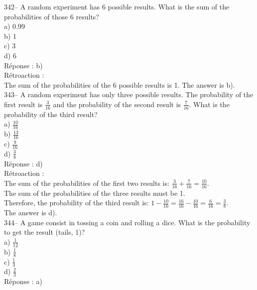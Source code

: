 \documentclass[letterpaper, 12pt]{article}
\begin{document}
342-- A random experiment has 6 possible results. What is the sum of the probabilities of those 6 results?\\

a) 0.99\\
b) 1\\
c) 3 \\
d) 6\\

R\'eponse : b)\\

R\'etroaction : \\
The sum of the probabilities of the 6 possible results is 1. The answer is b).\\

343-- A random experiment has only three possible results. The probability of the first result is $\frac{3}{16}$ and the probability of the second result is $\frac{7}{16}$. What is the probability of the third result?\\

a) $\frac{10}{16}$\\[2mm]
b) $\frac{13}{16}$\\[2mm]
c) $\frac{9}{16}$\\[2mm]
d) $\frac{3}{8}$\\

R\'eponse : d)\\

R\'etroaction : \\
The sum of the probabilities of the first two results is:
$\frac{3}{16}+\frac{7}{16}=\frac{10}{16}$.\\[2mm]
The sum of the probabilities of the three results must be 1.\\[2mm]
Therefore, the probability of the third result is:
$1-\frac{10}{16}=\frac{16}{16}-\frac{10}{16}=\frac{6}{16}=\frac{3}{8}.$\\[2mm]
The answer is d).\\

344-- A game consist in tossing a coin and rolling a dice. What is the probability to get the result (tails, 1)?\\

a) $\frac{1}{12}$\\[2mm]
b) $\frac{1}{8}$\\[2mm]
c) $\frac{1}{4}$\\[2mm]
d) $\frac{2}{3}$\\[2mm]

R\'eponse : a)\\
\end{document}
